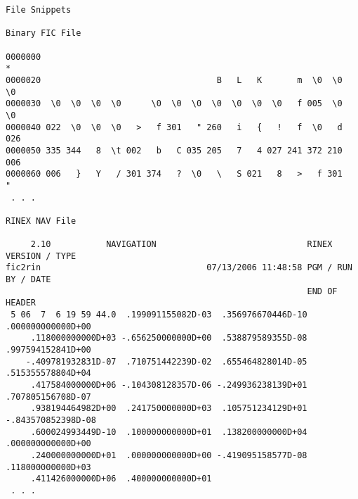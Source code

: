 \begin{\outputsize}
\begin{verbatim}
File Snippets

Binary FIC File

0000000
*
0000020                                   B   L   K       m  \0  \0  \0
0000030  \0  \0  \0  \0      \0  \0  \0  \0  \0  \0  \0   f 005  \0  \0
0000040 022  \0  \0  \0   >   f 301   " 260   i   {   !   f  \0   d 026
0000050 335 344   8  \t 002   b   C 035 205   7   4 027 241 372 210 006
0000060 006   }   Y   / 301 374   ?  \0   \   S 021   8   >   f 301   "
 . . .

RINEX NAV File

     2.10           NAVIGATION                              RINEX VERSION / TYPE
fic2rin                                 07/13/2006 11:48:58 PGM / RUN BY / DATE
                                                            END OF HEADER
 5 06  7  6 19 59 44.0  .199091155082D-03  .356976670446D-10  .000000000000D+00
     .118000000000D+03 -.656250000000D+00  .538879589355D-08  .997594152841D+00
    -.409781932831D-07  .710751442239D-02  .655464828014D-05  .515355578804D+04
     .417584000000D+06 -.104308128357D-06 -.249936238139D+01  .707805156708D-07
     .938194464982D+00  .241750000000D+03  .105751234129D+01 -.843570852398D-08
     .600024993449D-10  .100000000000D+01  .138200000000D+04  .000000000000D+00
     .240000000000D+01  .000000000000D+00 -.419095158577D-08  .118000000000D+03
     .411426000000D+06  .400000000000D+01
 . . .

\end{verbatim}
\end{\outputsize}

%
